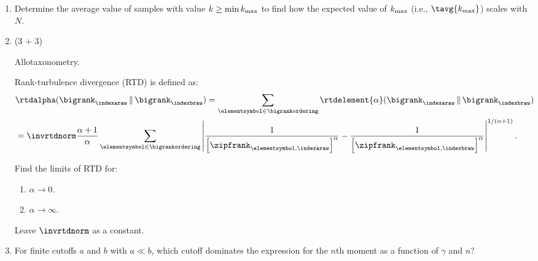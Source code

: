 \begin{enumerate}
  
   \solutionstart


   \solutionend
  

\item 
  Determine the average value of samples with value
  $k \ge \min k_{\rm max}$ to find how the expected
  value of $k_{\rm max}$ (i.e., $\tavg{k_{\max}}$) scales with $N$.


  
   \solutionstart


   \solutionend


\item (3 + 3)
  
  Allotaxonometry.

  Rank-turbulence divergence (RTD) is defined as:
  \begin{align}
    &
    \rtdalpha(
    \bigrank_{\indexaraw}
    \,\|\,
    \bigrank_{\indexbraw}
    )
    =
    \sum_{\elementsymbol \in \bigrankordering}
    \rtdelement{\alpha}(
    \bigrank_{\indexaraw}
    \,\|\,
    \bigrank_{\indexbraw}
    )
    \nonumber
    \\
    &
    =
    \invrtdnorm
    \frac{\alpha+1}{\alpha}
    \sum_{\elementsymbol \in \bigrankordering}
    \left\lvert
    \frac{1}{\left[\zipfrank_{\elementsymbol,\indexaraw}\right]^{\alpha}}
    -
    \frac{1}{\left[\zipfrank_{\elementsymbol,\indexbraw}\right]^{\alpha}}
    \right\rvert^{1/(\alpha+1)}.
    \label{eq:rankturbdiv.rankturbdiv_{g}ood}
  \end{align}

  Find the limits of RTD for:
  \begin{enumerate}
  \item
    $\alpha \rightarrow 0$.
  \item
    $\alpha \rightarrow \infty$.
  \end{enumerate}

  Leave $\invrtdnorm$ as a constant.

  
   \solutionstart


   \solutionend



\item

  For finite cutoffs $a$ and $b$ with $a \ll b$, which
  cutoff dominates the expression for the $n$th moment as a function
  of $\gamma$ and $n$?  


\end{enumerate}
